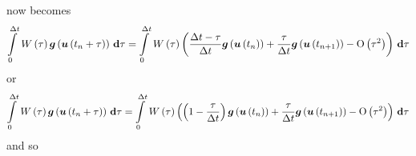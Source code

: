  now becomes
\begin{equation}
  \gint{0}{\Delta t}{\fnof{W}{\tau}\fnof{\vectr{g}}{\fnof{\vectr{u}}{t_{n}+\tau}}}{\tau}
  =\gint{0}{\Delta t}{\fnof{W}{\tau}
      \pbrac{\dfrac{\Delta t-\tau}{\Delta t}\fnof{\vectr{g}}{\fnof{\vectr{u}}{t_{n}}}+
        \dfrac{\tau}{\Delta t}\fnof{\vectr{g}}{\fnof{\vectr{u}}{t_{n+1}}}-\orderof{\tau^{2}}}}{\tau}
\end{equation}
or
\begin{equation}
  \gint{0}{\Delta t}{\fnof{W}{\tau}\fnof{\vectr{g}}{\fnof{\vectr{u}}{t_{n}+\tau}}}{\tau}
  =\gint{0}{\Delta t}{\fnof{W}{\tau}
      \pbrac{\pbrac{1-\dfrac{\tau}{{\Delta t}}}\fnof{\vectr{g}}{\fnof{\vectr{u}}{t_{n}}}+
        \dfrac{\tau}{\Delta t}\fnof{\vectr{g}}{\fnof{\vectr{u}}{t_{n+1}}}-\orderof{\tau^{2}}}}{\tau}
\end{equation}
and so
